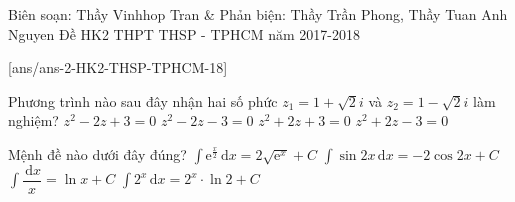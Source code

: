 \begin{name}
	{Biên soạn: Thầy Vinhhop Tran \& Phản biện: Thầy Trần Phong, Thầy Tuan Anh Nguyen}
	{Đề HK2 THPT THSP - TPHCM năm 2017-2018}
\end{name}
\setcounter{ex}{0}

[ans/ans-2-HK2-THSP-TPHCM-18]
\begin{ex}%
Phương trình nào sau đây nhận hai số phức $z_1=1+\sqrt2i$ và $z_2=1-\sqrt2i$ làm nghiệm?
\choice
{\True $z^2-2z+3=0$}
{$z^2-2z-3=0$}
{$z^2+2z+3=0$}
{$z^2+2z-3=0$}
\end{ex}

\begin{ex}%
Mệnh đề nào dưới đây đúng?
\choice
{\True $\displaystyle \int \mathrm{e}^{\frac x2}\mathrm{\,d}x=2\sqrt{\mathrm{e}^x}+C$}
{$\displaystyle \int \sin2x\mathrm{\,d}x=-2\cos2x+C$}
{$\displaystyle \int\dfrac{\mathrm{\,d}x}x=\ln x+C$}
{$\displaystyle \int 2^x\mathrm{\,d}x=2^x\cdot \ln2+C$}
\end{ex}

